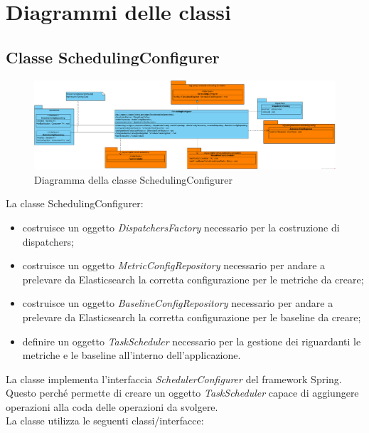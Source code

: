 \section{Diagrammi delle classi} \label{classDiag}

    \subsection{Classe SchedulingConfigurer}

        \begin{figure}[htbp]
            \centering
            \includegraphics[width=\textwidth]{./img/DiagrammiClasse/SchedulingConfigurer.png}
            \caption[Diagramma della classe SchedulingConfigurer]{Diagramma della classe SchedulingConfigurer}
        \end{figure}
        La classe SchedulingConfigurer:
        \begin{itemize}
        	\item costruisce un oggetto \textit{DispatchersFactory} necessario per la costruzione di dispatchers;
        	\item costruisce un oggetto \textit{MetricConfigRepository} necessario per andare a prelevare da 
        		Elasticsearch la corretta configurazione per le metriche da creare;
        	\item costruisce un oggetto \textit{BaselineConfigRepository} necessario per andare a prelevare da 
        		Elasticsearch la corretta configurazione per le baseline da creare;
        	\item definire un oggetto \textit{TaskScheduler} necessario per la gestione dei  riguardanti
        		le metriche e le baseline all'interno dell'applicazione.
        \end{itemize}
        La classe implementa l'interfaccia \textit{SchedulerConfigurer} del framework Spring. Questo perché permette
        di creare un oggetto \textit{TaskScheduler} capace di aggiungere operazioni alla coda delle operazioni da svolgere.\\
        La classe utilizza le seguenti classi/interfacce:
